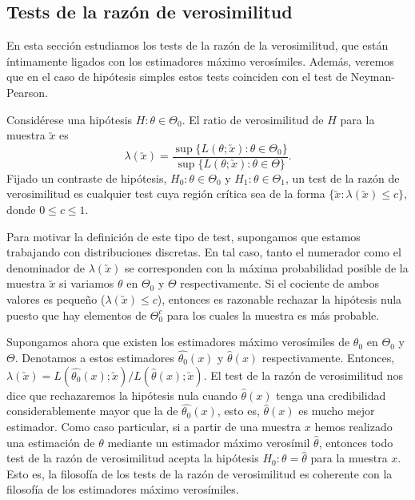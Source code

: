     \subsection{Tests de la razón de verosimilitud}

        En esta sección estudiamos los tests de la razón de la verosimilitud, que están íntimamente ligados con los estimadores máximo verosímiles. Además, veremos que en el caso de hipótesis simples estos tests coinciden con el test de Neyman-Pearson.

        \begin{definition}
            Considérese una hipótesis $H : \theta \in \Theta_0$. El ratio de verosimilitud de $H$ para la muestra $\utilde{x}$ es
            \[\lambda(\utilde{x}) = \frac{\sup\{L(\theta;\utilde{x}): \theta \in \Theta_0\}}{\sup\{L(\theta;\utilde{x}): \theta \in \Theta\}}. \]
            Fijado un contraste de hipótesis, $H_0 : \theta \in \Theta_0$ y $H_1 : \theta \in \Theta_1$, un test de la razón de verosimilitud es cualquier test cuya región crítica sea de la forma $\{\utilde{x} : \lambda(\utilde{x}) \le c\}$, donde $0 \le c \le 1$.
        \end{definition}

        Para motivar la definición de este tipo de test, supongamos que estamos trabajando con distribuciones discretas. En tal caso, tanto el numerador como el denominador de $\lambda(\utilde{x})$ se corresponden con la máxima probabilidad posible de la muestra $\utilde{x}$ si variamos $\theta$ en $\Theta_0$ y $\Theta$ respectivamente. Si el cociente de ambos valores es pequeño ($\lambda(\utilde{x}) \le c$), entonces es razonable rechazar la hipótesis nula puesto que hay elementos de $\Theta_0^c$ para los cuales la muestra es más probable.

        Supongamos ahora que existen los estimadores máximo verosímiles de $\theta_0$ en $\Theta_0$ y $\Theta$. Denotamos a estos estimadores $\hat{\theta_0}(x)$ y $\hat{\theta}(x)$ respectivamente. Entonces, $\lambda(\utilde{x}) = L(\hat{\theta_0}(x);\utilde{x}) / L(\hat{\theta}(x);\utilde{x})$. El test de la razón de verosimilitud nos dice que rechazaremos la hipótesis nula cuando $\hat{\theta}(x)$  tenga una credibilidad considerablemente mayor que la de $\hat{\theta_0}(x)$, esto es, $\hat{\theta}(x)$ es mucho mejor estimador. Como caso particular, si a partir de una muestra $x$ hemos realizado una estimación de $\theta$ mediante un estimador máximo verosímil $\hat{\theta}$, entonces todo test de la razón de verosimilitud acepta la hipótesis $H_0: \theta = \hat{\theta}$ para la muestra $x$. Esto es, la filosofía de los tests de la razón de verosimilitud es coherente con la filosofía de los estimadores máximo verosímiles.

